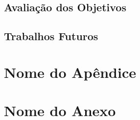 \documentclass[openright]{normas-utf-tex} %
\begin{document}
	\section{Avaliação dos Objetivos}

		

	\section{Trabalhos Futuros}

		

\clearpage %
\label{bibstart}
\label{bibend}

\apendice
\chapter{Nome do Ap\^endice}

\anexo
\chapter{Nome do Anexo}
\end{document}
